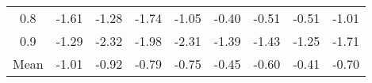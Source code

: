 \begin{longtable}{ | c || c | c | c | c | c | c | c || c |}
0.8 &  \cellcolor[HTML]{FFD7D7} -1.61 &  \cellcolor[HTML]{FFDFDF} -1.28 &  \cellcolor[HTML]{FFD7D7} -1.74 &  \cellcolor[HTML]{FFE7E7} -1.05 &  \cellcolor[HTML]{FFF7F7} -0.40 &  \cellcolor[HTML]{FFEFEF} -0.51 &  \cellcolor[HTML]{FFEFEF} -0.51 &  \cellcolor[HTML]{FFE7E7} -1.01 \\
0.9 &  \cellcolor[HTML]{FFDFDF} -1.29 &  \cellcolor[HTML]{FFC7C7} -2.32 &  \cellcolor[HTML]{FFCFCF} -1.98 &  \cellcolor[HTML]{FFC7C7} -2.31 &  \cellcolor[HTML]{FFDFDF} -1.39 &  \cellcolor[HTML]{FFD7D7} -1.43 &  \cellcolor[HTML]{FFDFDF} -1.25 &  \cellcolor[HTML]{FFD7D7} -1.71 \\
\hline
\hline
Mean  &  \cellcolor[HTML]{FFE7E7} -1.01 &  \cellcolor[HTML]{FFE7E7} -0.92 &  \cellcolor[HTML]{FFEFEF} -0.79 &  \cellcolor[HTML]{FFEFEF} -0.75 &  \cellcolor[HTML]{FFF7F7} -0.45 &  \cellcolor[HTML]{FFEFEF} -0.60 &  \cellcolor[HTML]{FFF7F7} -0.41 &  \cellcolor[HTML]{FFEFEF} -0.70 \\
\hline
\end{longtable}

